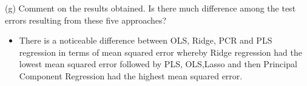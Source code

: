 \documentclass[
  ignorenonframetext,
]{beamer}
\providecommand{\tightlist}{%
  \setlength{\itemsep}{0pt}\setlength{\parskip}{0pt}}
\begin{document}
\begin{frame}{(g) Comment on the results obtained. Is there much
difference among the test errors resulting from these five approaches?}
\protect\hypertarget{g-comment-on-the-results-obtained.-is-there-much-difference-among-the-test-errors-resulting-from-these-five-approaches}{}

\begin{itemize}
\tightlist
\item
  There is a noticeable difference between OLS, Ridge, PCR and PLS
  regression in terms of mean squared error whereby Ridge regression had
  the lowest mean squared error followed by PLS, OLS,Lasso and then
  Principal Component Regression had the highest mean squared error.
\end{itemize}

\end{frame}
\end{document}
